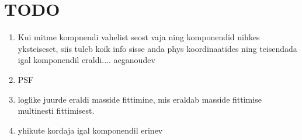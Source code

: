 \documentclass{article}
\begin{document}
	
	
	
	
	\section{TODO} %
	\label{sec:todo}
	\begin{enumerate}
		\item Kui mitme kompnendi vahelist seost vaja ning komponendid nihkes yksteiseset, siis tuleb koik info sisse anda phys koordinaatides ning teisendada igal komponendil eraldi.... aeganoudev
		\item PSF
		\item loglike juurde eraldi masside fittimine, mis eraldab masside fittimise multinesti fittimisest.
		\item yhikute kordaja igal komponendil erinev
	\end{enumerate}
\end{document}

